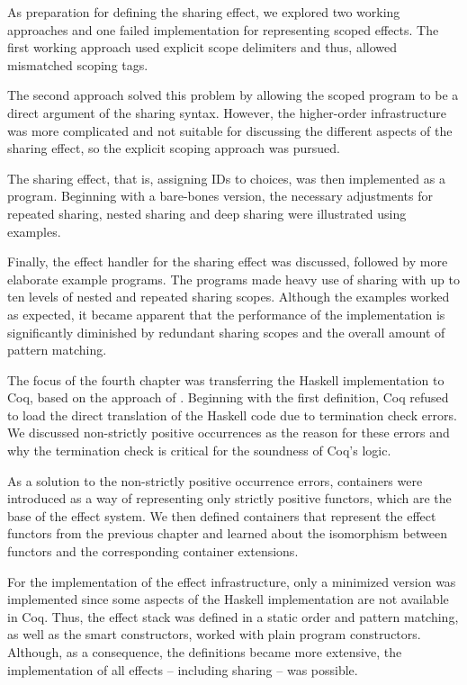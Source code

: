 \documentclass[a4paper, 11pt, fleqn, twoside, abstract=on]{scrreprt}
\begin{document}
As preparation for defining the sharing effect, we explored two working approaches and one failed implementation for representing scoped effects.
The first working approach used explicit scope delimiters and thus, allowed mismatched scoping tags.

The second approach solved this problem by allowing the scoped program to be a direct argument of the sharing syntax.
However, the higher-order infrastructure was more complicated and not suitable for discussing the different aspects of the sharing effect, so the explicit scoping approach was pursued.

The sharing effect, that is, assigning IDs to choices, was then implemented as a program.
Beginning with a bare-bones version, the necessary adjustments for repeated sharing, nested sharing and deep sharing were illustrated using examples.

Finally, the effect handler for the sharing effect was discussed, followed by more elaborate example programs.
The programs made heavy use of sharing with up to ten levels of nested and repeated sharing scopes.
Although the examples worked as expected, it became apparent that the performance of the implementation is significantly diminished by redundant sharing scopes and the overall amount of pattern matching.

The focus of the fourth chapter was transferring the Haskell implementation to Coq, based on the approach of \citet{dylus2019oneMonad}.
Beginning with the first definition, Coq refused to load the direct translation of the Haskell code due to termination check errors.
We discussed non-strictly positive occurrences as the reason for these errors and why the termination check is critical for the soundness of Coq's logic.

As a solution to the non-strictly positive occurrence errors, containers were introduced as a way of representing only strictly positive functors, which are the base of the effect system.
We then defined containers that represent the effect functors from the previous chapter and learned about the isomorphism between functors and the corresponding container extensions.

For the implementation of the effect infrastructure, only a minimized version was implemented since some aspects of the Haskell implementation are not available in Coq.
Thus, the effect stack was defined in a static order and pattern matching, as well as the smart constructors, worked with plain program constructors.
Although, as a consequence, the definitions became more extensive, the implementation of all effects -- including sharing -- was possible.
\end{document}
